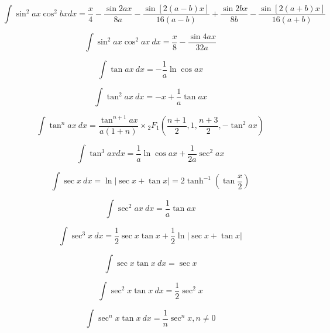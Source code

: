 \documentclass[12pt,letterpaper,leqno]{article}
\begin{document}
\begin{equation}
\int \sin^2 ax \cos^2 bx dx = \frac{x}{4}
-\frac{\sin 2ax}{8a}-
\frac{\sin[2(a-b)x]}{16(a-b)}
+\frac{\sin 2bx}{8b}-
\frac{\sin[2(a+b)x]}{16(a+b)}
\end{equation}

\begin{equation}
\int \sin^2 ax \cos^2 ax\ dx = \frac{x}{8}-\frac{\sin 4ax}{32a}
\end{equation}

\begin{equation}
\int \tan ax\ dx = -\frac{1}{a} \ln \cos ax 
\end{equation}

\begin{equation}
\int \tan^2 ax\ dx = -x + \frac{1}{a} \tan ax 
\end{equation}

\begin{equation}
\int \tan^n ax\ dx = 
\frac{\tan^{n+1} ax }{a(1+n)} \times
 {_2}F_1\left( \frac{n+1}{2}, 
1, \frac{n+3}{2}, -\tan^2 ax \right) 
\end{equation}

\begin{equation}
\int \tan^3 ax dx = \frac{1}{a} \ln \cos ax + \frac{1}{2a}\sec^2 ax 
\end{equation}

\begin{equation}
\int \sec x \ dx = \ln | \sec x + \tan x | = 2 \tanh^{-1} \left (\tan \frac{x}{2} \right) 
\end{equation}

\begin{equation}
\int \sec^2 ax\ dx = \frac{1}{a} \tan ax 
\end{equation}

\begin{equation}\label{eq:Kloeppel}
\int \sec^3 x \ {dx} = \frac{1}{2} \sec x \tan x + \frac{1}{2}\ln | \sec x + \tan x |
\end{equation}

\begin{equation}
\int \sec x \tan x\ dx = \sec x 
\end{equation}

\begin{equation}
\int \sec^2 x \tan x\ dx = \frac{1}{2} \sec^2 x 
\end{equation}

\begin{equation}
\int \sec^n x \tan x \ dx = \frac{1}{n} \sec^n x , n\ne 0
\end{equation}
\end{document}
